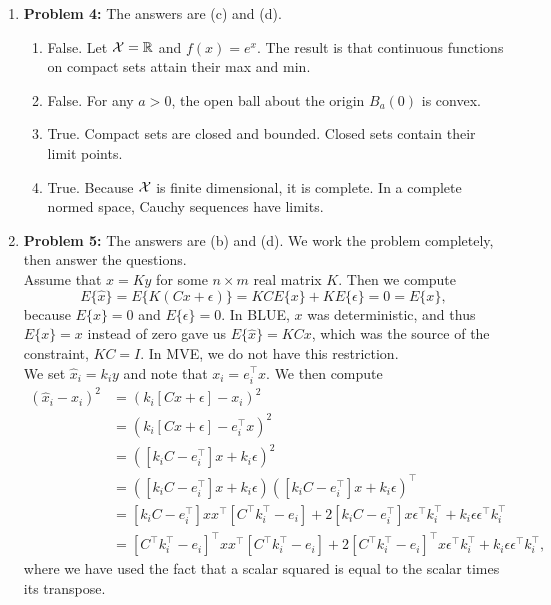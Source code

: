 \documentclass[letterpaper]{article}
\begin{document}
\begin{enumerate}
\item \noindent \textbf{Problem 4:}
The answers are (c) and (d).
\begin{enumerate}
\setlength{\itemsep}{.1in}
\renewcommand{\labelenumi}{(\alph{enumi})}


\item False. Let ${\cal X} = \mathbb R$ and $f(x) = e^x$. The result is that continuous functions on compact sets attain their max and min.

\item False.  For any $a>0$, the open ball about the origin $B_a(0)$ is convex.

\item True. Compact sets are closed and bounded. Closed sets contain their limit points.

\item True. Because ${\cal X}$ is finite dimensional, it is complete. In a complete normed  space, Cauchy sequences have limits.


\end{enumerate}

\item \noindent \textbf{Problem 5:}
The answers are (b) and (d).  We work the problem completely, then answer the questions. \\

Assume that $\widehat{x} = K y$ for some $n \times m$ real matrix $K$. Then we compute
$$ E\{\widehat{x}  \}  = E\{ K(Cx + \epsilon)  \} = KC E\{x  \}+ K E\{ \epsilon  \} =0 = E\{x  \},$$
because $E\{x  \}=0$ and $E\{ \epsilon  \}=0$. In BLUE, $x$ was deterministic, and thus $E\{x  \}=x$ instead of zero gave us $E\{\widehat{x}  \} = KC x$, which was the source of the constraint, $KC=I$. In MVE, we do not have this restriction.\\

We set $\widehat{x}_i = k_i y$ and note that $x_i = e_i^\top x$. We then compute
\begin{align*}
 \left( \widehat{x}_i - x_i \right)^2 &=  \left(k_i [Cx+\epsilon] - x_i \right)^2 \\
 &=  \left(k_i [Cx+\epsilon] - e_i^\top x \right)^2\\
 &= \left([ k_i C - e^\top_i ]x+k_i\epsilon \right)^2 \\
 &= \left([ k_i C - e^\top_i ]x+k_i\epsilon \right) \left([ k_i C - e^\top_i ]x+k_i\epsilon \right)^\top \\
  &= [ k_iC-e_i^\top] x x^\top [C^\top k_i^\top-e_i] + 2 [k_iC-e_i^\top] x \epsilon^\top k_i^\top + k_i\epsilon \epsilon^\top k_i^\top \\
 &= [C^\top k_i^\top-e_i]^\top x x^\top [C^\top k_i^\top-e_i] + 2 [C^\top k_i^\top-e_i]^\top x \epsilon^\top k_i^\top + k_i\epsilon \epsilon^\top k_i^\top,
\end{align*}
where we have used the fact that a scalar squared is equal to the scalar times its transpose.


\end{enumerate}
\end{document}
